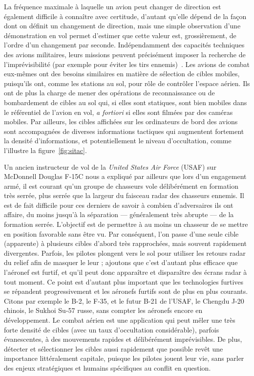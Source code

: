 	La fréquence maximale à laquelle un avion peut changer de direction est également difficile à connaître avec certitude, d'autant qu'elle dépend de la façon dont on définit un changement de direction, mais une simple observation d'une démonstration en vol permet d'estimer que cette valeur est, grossièrement, de l'ordre d'un changement par seconde.\footnotemark{} Indépendamment des capacités techniques des avions militaires, leurs missions peuvent précisément imposer la recherche de l'imprévisibilité (par exemple pour éviter les tirs ennemis)~\cite{shaw1985fighter}. Les avions de combat eux-mêmes ont des besoins similaires en matière de sélection de cibles mobiles, puisqu'ils ont, comme les stations au sol, pour rôle de contrôler l'espace aérien. Ils ont de plus la charge de mener des opérations de reconnaissance ou de bombardement de cibles au sol qui, si elles sont statiques, sont bien mobiles dans le référentiel de l'avion en vol, \emph{a fortiori} si elles sont filmées par des caméras mobiles. Par ailleurs, les cibles affichées sur les ordinateurs de bord des avions sont accompagnées de diverses informations tactiques qui augmentent fortement la densité d'informations, et potentiellement le niveau d'occultation, comme l'illustre la figure~\ref{fig:sitac}.	
	
	
	Un ancien instructeur de vol de la \emph{United States Air Force} (USAF) sur McDonnell Douglas F-15C nous a expliqué par ailleurs que lors d'un engagement armé, il est courant qu'un groupe de chasseurs vole délibérément en formation très serrée, plus serrée que la largeur du faisceau radar des chasseurs ennemis. Il est de fait difficile pour ces derniers de savoir à combien d'adversaires ils ont affaire, du moins jusqu'à la séparation --- généralement très abrupte --- de la formation serrée. L'objectif est de permettre à au moins un chasseur de se mettre en position favorable sans être vu. Par conséquent, l'on passe d'une seule cible (apparente) à plusieurs cibles d'abord très rapprochées, mais souvent rapidement divergentes. Parfois, les pilotes plongent vers le sol pour utiliser les retours radar du relief afin de masquer le leur ; ajoutons que c'est d'autant plus efficace que l'aéronef est furtif, et qu'il peut donc apparaître et disparaître des écrans radar à tout moment. Ce point est d'autant plus important que les technologies furtives se répandent progressivement et les aéronefs furtifs sont de plus en plus courants. Citons par exemple le B-2, le F-35, et le futur B-21 de l'USAF, le Chengdu J-20 chinois, le Sukhoi Su-57 russe, sans compter les aéronefs encore en développement. Le combat aérien est une application qui peut mêler une très forte densité de cibles (avec un taux d'occultation considérable), parfois évanescentes, à des mouvements rapides et délibérément imprévisibles. De plus, détecter et sélectionner les cibles aussi rapidement que possible revêt une importance littéralement capitale, puisque les pilotes jouent leur vie, sans parler des enjeux stratégiques et humains spécifiques au conflit en question.
	
